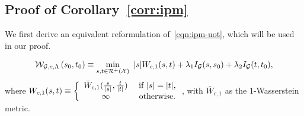 \subsection[Proof of Metricity of MMD-OT]{Proof of Corollary~\ref{corr:ipm}}\label{proof:corr-metricity}
We first derive an equivalent reformulation of~\ref{eqn:ipm-uot}, which will be used in our proof.
\begin{lemmaBox}
\begin{lemma}\label{lemma:wipm-proposed}
\begin{equation}\label{eqn:proposedeq}
    \mathcal{W}_{\mathcal{G}, c, \Lambda}\left(s_0,t_0\right) \equiv\min\limits_{s,t\in\mathcal{R}^+(\mathcal{X})}\  |s| W_{c, 1}(s,t) + \lambda_1  I_{\mathcal{G}}(s,s_0) + \lambda_2  I_{\mathcal{G}}(t,t_0),
\end{equation}
where $W_{c, 1}(s,t)\equiv\left\{\begin{array}{cc}
    \bar{W}_{c,1}(\frac{s}{|s|},\frac{t}{|t|}) & \textup{ if } |s|=|t|, \\
    \infty & \textup{ otherwise}.
\end{array}\right.$, with $\bar{W}_{c,1}$ as the 1-Wasserstein metric.
\end{lemma}
\end{lemmaBox}
